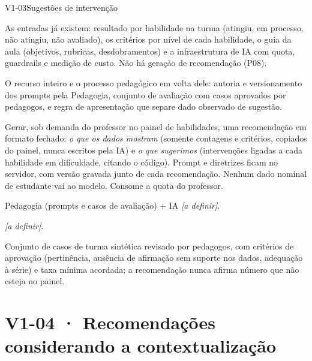 \begin{resposta}{V1-03}{Sugestões de intervenção}{\naoimpl}
\begin{campos}
  \item[Existe] As entradas já existem: resultado por habilidade na turma
    (atingiu, em processo, não atingiu, não avaliado), os critérios por nível
    de cada habilidade, o guia da aula (objetivos, rubricas, desdobramentos)
    e a infraestrutura de IA com quota, guardrails e medição de custo. Não há
    geração de recomendação (P08).
  \item[Diferença] O recurso inteiro e o processo pedagógico em volta dele:
    autoria e versionamento dos prompts pela Pedagogia, conjunto de
    avaliação com casos aprovados por pedagogos, e regra de apresentação que
    separe dado observado de sugestão.
  \item[Proposta] Gerar, sob demanda do professor no painel de habilidades,
    uma recomendação em formato fechado: \emph{o que os dados mostram}
    (somente contagens e critérios, copiados do painel, nunca escritos pela
    IA) e \emph{o que sugerimos} (intervenções ligadas a cada habilidade em
    dificuldade, citando o código). Prompt e diretrizes ficam no servidor,
    com versão gravada junto de cada recomendação. Nenhum dado nominal de
    estudante vai ao modelo. Consome a quota do professor.
  \item[Responsável] Pedagogia (prompts e casos de avaliação) + IA
    \textit{[a definir]}.
  \item[Homologação] \textit{[a definir]}.
  \item[Aceite] Conjunto de casos de turma sintética revisado por pedagogos,
    com critérios de aprovação (pertinência, ausência de afirmação sem
    suporte nos dados, adequação à série) e taxa mínima acordada; a
    recomendação nunca afirma número que não esteja no painel.
\end{campos}
\end{resposta}

\section{V1-04 · Recomendações considerando a contextualização}

